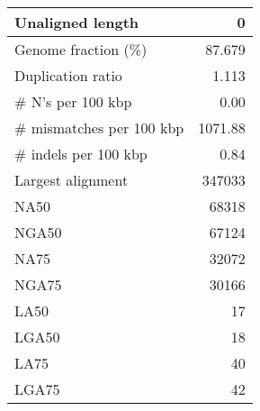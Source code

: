 \documentclass[12pt,a4paper]{article}
\begin{document}
\begin{table}[ht]
\begin{center}
\begin{tabular}{|l*{1}{|r}|}
Unaligned length & 0 \\ \hline
Genome fraction (\%) & 87.679 \\ \hline
Duplication ratio & 1.113 \\ \hline
\# N's per 100 kbp & 0.00 \\ \hline
\# mismatches per 100 kbp & 1071.88 \\ \hline
\# indels per 100 kbp & 0.84 \\ \hline
Largest alignment & 347033 \\ \hline
NA50 & 68318 \\ \hline
NGA50 & 67124 \\ \hline
NA75 & 32072 \\ \hline
NGA75 & 30166 \\ \hline
LA50 & 17 \\ \hline
LGA50 & 18 \\ \hline
LA75 & 40 \\ \hline
LGA75 & 42 \\ \hline
\end{tabular}
\end{center}
\end{table}
\end{document}

